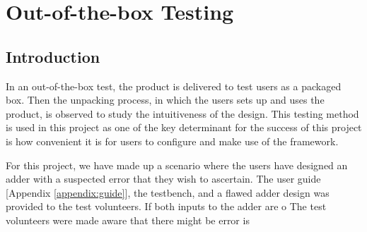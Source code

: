 \chapter{Out-of-the-box Testing}

\section{Introduction}
In an out-of-the-box test, the product is delivered to test users as a packaged box.
Then the unpacking process, in which the users sets up and uses the product, is observed to study the intuitiveness of the design.
This testing method is used in this project as one of the key determinant for the success of this project is how convenient it is for users to configure and make use of the framework.

For this project, we have made up a scenario where the users have designed an adder with a suspected error that they wish to ascertain.
The user guide [Appendix \ref{appendix:guide}], the testbench, and a flawed adder design was provided to the test volunteers.
If both inputs to the adder are o
The test volunteers were made aware that there might be error is

